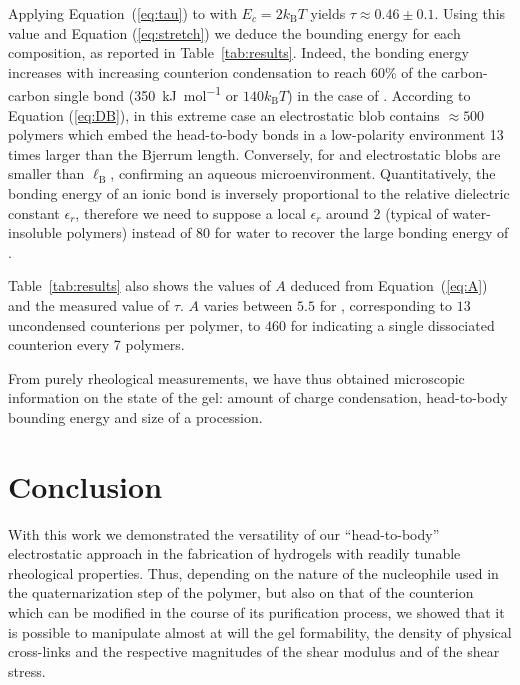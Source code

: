 \documentclass[journal=jacsat,manuscript=article]{achemso}
\begin{document}
Applying Equation~(\ref{eq:tau}) to  with $E_c = 2 k_\mathrm{B}T$ yields $\tau \approx 0.46\pm 0.1$. Using this value and Equation (\ref{eq:stretch}) we deduce the bounding energy for each composition, as reported in Table~\ref{tab:results}. Indeed, the bonding energy increases with increasing counterion condensation to reach 60\% of the carbon-carbon single bond (\SI{350}{\kilo\joule\per\mole} or $140 k_\mathrm{B}T$) in the case of . According to Equation (\ref{eq:DB}), in this extreme case an electrostatic blob contains $\approx 500$ polymers which embed the head-to-body bonds in a low-polarity environment 13 times larger than the Bjerrum length. Conversely, for  and  electrostatic blobs are smaller than $\ell_\mathrm{B}$, confirming an aqueous microenvironment. Quantitatively, the bonding energy of an ionic bond is inversely proportional to the relative dielectric constant $\epsilon_r$, therefore we need to suppose a local $\epsilon_r$ around 2 (typical of water-insoluble polymers) instead of 80 for water to recover the large bonding energy of .

Table~\ref{tab:results} also shows the values of $A$ deduced from Equation~(\ref{eq:A}) and the measured value of $\tau$. $A$ varies between $5.5$ for , corresponding to $13$ uncondensed counterions per polymer, to $460$ for  indicating a single dissociated counterion every 7 polymers.

From purely rheological measurements, we have thus obtained microscopic information on the state of the gel: amount of charge condensation, head-to-body bounding energy and size of a procession.




\section{Conclusion}
With this work we demonstrated the versatility of our ``head-to-body'' electrostatic approach in the fabrication of hydrogels with readily tunable rheological properties. Thus, depending on the nature of the nucleophile used in the quaternarization step of the polymer, but also on that of the counterion which can be modified in the course of its purification process, we showed that it is possible to manipulate almost at will the gel formability, the density of physical cross-links and the respective magnitudes of the shear modulus and of the shear stress. 
\end{document}
